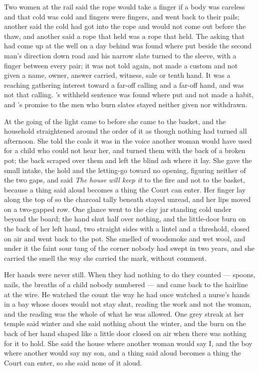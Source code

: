 Two women at the rail said the rope would take a finger if a body was careless and that cold was cold and fingers were fingers, and went back to their pails; another said the cold had got into the rope and would not come out before the thaw, and another said a rope that held was a rope that held. The asking that had come up at the well on a day behind was found where put beside the second man's direction down  road and his narrow slate turned to the sleeve, with a finger between every pair; it was not told again, not made a custom and not given a name, owner, answer carried, witness, sale or tenth hand. It was a reaching gathering interest toward a far-off calling and a far-off hand, and was not that calling. 's withheld sentence was found where put and not made a habit, and 's promise to the men who burn slates stayed neither given nor withdrawn.

\scenebreak

At the going of the light  came to  before she came to the basket, and the household straightened around the order of it as though nothing had turned all afternoon. She told the coals it was  in the voice another woman would have used for a child who could not hear her, and turned them with the back of a broken pot; the back scraped over them and left the blind ash where it lay. She gave the small intake, the hold and the letting-go toward no opening, figuring neither of the two gaps, and said \emph{The house will keep it} to the fire and not to the basket, because a thing said aloud becomes a thing the Court can enter. Her finger lay along the top of  so the charcoal tally beneath stayed unread, and her lips moved on a two-gapped row. One glance went to the clay jar standing cold under  beyond the board; the hand shut half over nothing, and the little-door burn on the back of her left hand, two straight sides with a lintel and a threshold, closed on air and went back to the pot. She smelled of woodsmoke and wet wool, and under it the faint sour tang of the corner nobody had swept in two years, and she carried the smell the way she carried the mark, without comment.

Her hands were never still. When they had nothing to do they counted --- spoons, nails, the breaths of a child nobody numbered --- and came back to the hairline at the wire. He watched the count the way he had once watched a nurse's hands in a bay whose doors would not stay shut, reading the work and not the woman, and the reading was the whole of what he was allowed. One grey streak at her temple said winter and she said nothing about the winter, and the burn on the back of her hand shaped like a little door closed on air when there was nothing for it to hold. She said the house where another woman would say I, and the boy where another would say my son, and a thing said aloud becomes a thing the Court can enter, so she said none of it aloud.


